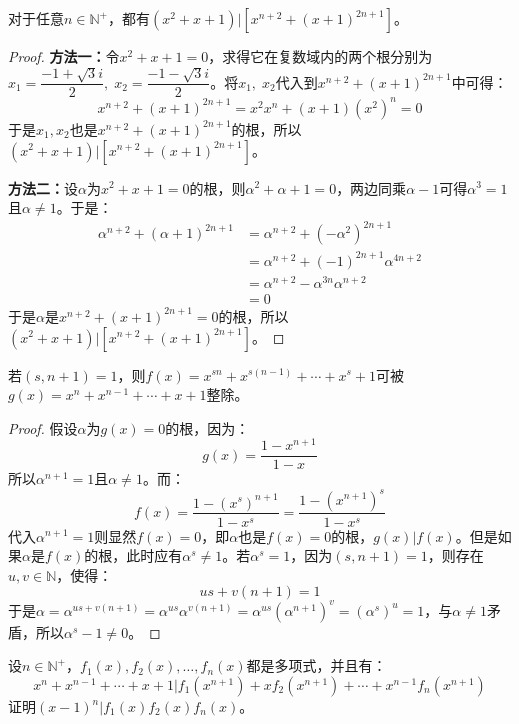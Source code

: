 \begin{theorem}
	对于任意$n\in\mathbb{N}^+$，都有$(x^2+x+1)\Big|[x^{n+2}+(x+1)^{2n+1}]$。
\end{theorem}
\begin{proof}
	\textbf{方法一：}令$x^2+x+1=0$，求得它在复数域内的两个根分别为$x_1=\dfrac{-1+\sqrt{3}i}{2},\;x_2=\dfrac{-1-\sqrt{3}i}{2}$。将$x_1,\;x_2$代入到$x^{n+2}+(x+1)^{2n+1}$中可得：
	\begin{equation*}
		x^{n+2}+(x+1)^{2n+1}=x^2x^n+(x+1)\left(x^2\right)^n=0
	\end{equation*}
	于是$x_1,x_2$也是$x^{n+2}+(x+1)^{2n+1}$的根，所以$(x^2+x+1)\Big|[x^{n+2}+(x+1)^{2n+1}]$。\par
	\textbf{方法二：}设$\alpha$为$x^2+x+1=0$的根，则$\alpha^2+\alpha+1=0$，两边同乘$\alpha-1$可得$\alpha^3=1$且$\alpha\ne1$。于是：
	\begin{align*}
		\alpha^{n+2}+(\alpha+1)^{2n+1}
		&=\alpha^{n+2}+(-\alpha^2)^{2n+1} \\
		&=\alpha^{n+2}+(-1)^{2n+1}\alpha^{4n+2} \\
		&=\alpha^{n+2}-\alpha^{3n}\alpha^{n+2} \\
		&=0
	\end{align*}
	于是$\alpha$是$x^{n+2}+(x+1)^{2n+1}=0$的根，所以$(x^2+x+1)\Big|[x^{n+2}+(x+1)^{2n+1}]$。
\end{proof}
\begin{theorem}
	若$(s,n+1)=1$，则$f(x)=x^{sn}+x^{s(n-1)}+\cdots+x^s+1$可被$g(x)=x^n+x^{n-1}+\cdots+x+1$整除。
\end{theorem}
\begin{proof}
	假设$\alpha$为$g(x)=0$的根，因为：
	\begin{equation*}
		g(x)=\frac{1-x^{n+1}}{1-x}
	\end{equation*}
	所以$\alpha^{n+1}=1$且$\alpha\ne1$。而：
	\begin{equation*}
		f(x)=\frac{1-(x^s)^{n+1}}{1-x^s}=\frac{1-(x^{n+1})^s}{1-x^s}
	\end{equation*}
	代入$\alpha^{n+1}=1$则显然$f(x)=0$，即$\alpha$也是$f(x)=0$的根，$g(x)|f(x)$。但是如果$\alpha$是$f(x)$的根，此时应有$\alpha^s\ne1$。若$\alpha^s=1$，因为$(s,n+1)=1$，则存在$u,v\in\mathbb{N}$，使得：
	\begin{equation*}
		us+v(n+1)=1
	\end{equation*}
	于是$\alpha=\alpha^{us+v(n+1)}=\alpha^{us}\alpha^{v(n+1)}=\alpha^{us}(\alpha^{n+1})^v=(\alpha^s)^u=1$，与$\alpha\ne1$矛盾，所以$\alpha^s-1\ne0$。
\end{proof}
\begin{theorem}
	设$n\in\mathbb{N}^+$，$f_1(x),f_2(x),\dots,f_n(x)$都是多项式，并且有：
	\begin{equation*}
		x^n+x^{n-1}+\cdots+x+1|f_1(x^{n+1})+xf_2(x^{n+1})+\cdots+x^{n-1}f_n(x^{n+1})
	\end{equation*}
	证明$(x-1)^n|f_1(x)f_2(x)f_n(x)$。
\end{theorem}
